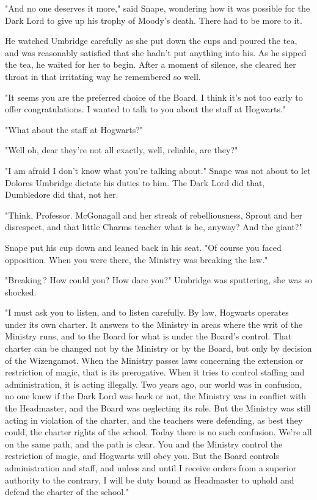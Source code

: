 "And no one deserves it more," said Snape, wondering how it was possible for the Dark Lord to give up his trophy of Moody's death. There had to be more to it.

He watched Umbridge carefully as she put down the cups and poured the tea, and was reasonably satisfied that she hadn't put anything into his. As he sipped the tea, he waited for her to begin. After a moment of silence, she cleared her throat in that irritating way he remembered so well.

"It seems you are the preferred choice of the Board. I think it's not too early to offer congratulations. I wanted to talk to you about the staff at Hogwarts."

"What about the staff at Hogwarts?"

"Well{\el} oh, dear{\el} they're not all exactly, well, reliable, are they?"

"I am afraid I don't know what you're talking about." Snape was not about to let Dolores Umbridge dictate his duties to him. The Dark Lord did that, Dumbledore did that, not her.

"Think, Professor. McGonagall and her streak of rebelliousness, Sprout and her disrespect, and that little Charms teacher{\el} what is he, anyway? And the giant?"

Snape put his cup down and leaned back in his seat. "Of course you faced opposition. When you were there, the Ministry was breaking the law."

"Breaking{\el}\,? How could you? How dare you?" Umbridge was sputtering, she was so shocked.

"I must ask you to listen, and to listen carefully. By law, Hogwarts operates under its own charter. It answers to the Ministry in areas where the writ of the Ministry runs, and to the Board for what is under the Board's control. That charter can be changed not by the Ministry or by the Board, but only by decision of the Wizengamot. When the Ministry passes laws concerning the extension or restriction of magic, that is its prerogative. When it tries to control staffing and administration, it is acting illegally. Two years ago, our world was in confusion, no one knew if the Dark Lord was back or not, the Ministry was in conflict with the Headmaster, and the Board was neglecting its role. But the Ministry was still acting in violation of the charter, and the teachers were defending, as best they could, the charter rights of the school. Today there is no such confusion. We're all on the same path, and the path is clear. You and the Ministry control the restriction of magic, and Hogwarts will obey you. But the Board controls administration and staff, and unless and until I receive orders from a superior authority to the contrary, I will be duty bound as Headmaster to uphold and defend the charter of the school."

